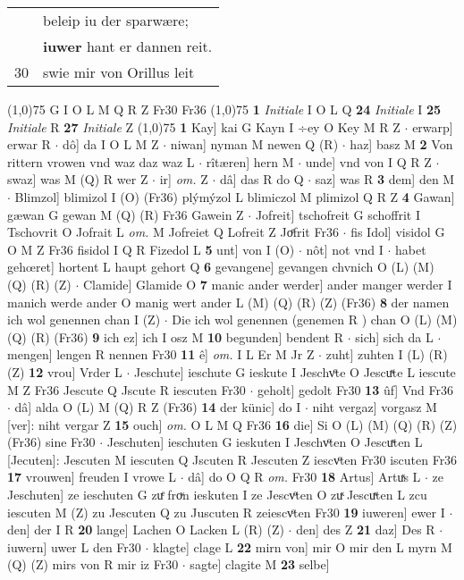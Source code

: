 \documentclass[8pt,a4paper,notitlepage]{article}
\begin{document}
\begin{table}[ht]
\begin{minipage}[t]{0.5\linewidth}
\begin{tabular}{rl}
 & beleip iu der sparwære;\\ 
 & \textbf{iuwer} hant er dannen reit.\\ 
30 & swie mir von Orillus leit\\ 
\end{tabular}
\scriptsize
\line(1,0){75} \newline
G I O L M Q R Z Fr30 Fr36 \newline
\line(1,0){75} \newline
\textbf{1} \textit{Initiale} I O L Q  \textbf{24} \textit{Initiale} I  \textbf{25} \textit{Initiale} R  \textbf{27} \textit{Initiale} Z  \newline
\line(1,0){75} \newline
\textbf{1} Kay] kai G Kayn I ÷ey O Key M R Z  $\cdot$ erwarp] erwar R  $\cdot$ dô] da I O L M Z  $\cdot$ niwan] nyman M newen Q (R)  $\cdot$ haz] basz M \textbf{2} Von rittern vrowen vnd waz daz waz L  $\cdot$ rîtæren] hern M  $\cdot$ unde] vnd von I Q R Z  $\cdot$ swaz] was M (Q) R wer Z  $\cdot$ ir] \textit{om.} Z  $\cdot$ dâ] das R do Q  $\cdot$ saz] was R \textbf{3} dem] den M  $\cdot$ Blimzol] blimizol I (O) (Fr36) plýmýzol L blimiczol M plimizol Q R Z \textbf{4} Gawan] gæwan G gewan M (Q) (R) Fr36 Gawein Z  $\cdot$ Jofreit] tschofreit G schoffrit I Tschovrit O Jofrait L \textit{om.} M Jofreiet Q Lofreit Z Joͤfrit Fr36  $\cdot$ fis Idol] visidol G O M Z Fr36 fisidol I Q R Fizedol L \textbf{5} unt] von I (O)  $\cdot$ nôt] not vnd I  $\cdot$ habet gehœret] hortent L haupt gehort Q \textbf{6} gevangene] gevangen chvnich O (L) (M) (Q) (R) (Z)  $\cdot$ Clamide] Glamide O \textbf{7} manic ander werder] ander manger werder I manich werde ander O manig wert ander L (M) (Q) (R) (Z) (Fr36) \textbf{8} der namen ich wol genennen chan I (Z)  $\cdot$ Die ich wol genennen (genemen R ) chan O (L) (M) (Q) (R) (Fr36) \textbf{9} ich ez] ich I osz M \textbf{10} begunden] bendent R  $\cdot$ sich] sich da L  $\cdot$ mengen] lengen R nennen Fr30 \textbf{11} ê] \textit{om.} I L Er M Jr Z  $\cdot$ zuht] zuhten I (L) (R) (Z) \textbf{12} vrou] Vrder L  $\cdot$ Jeschute] ieschute G ieskute I Jeschvͦte O Jescuͯte L iescute M Z Fr36 Jescute Q Jscute R iescuten Fr30  $\cdot$ geholt] gedolt Fr30 \textbf{13} ûf] Vnd Fr36  $\cdot$ dâ] alda O (L) M (Q) R Z (Fr36) \textbf{14} der künic] do I  $\cdot$ niht vergaz] vorgasz M [ver]: niht vergar Z \textbf{15} ouch] \textit{om.} O L M Q Fr36 \textbf{16} die] Si O (L) (M) (Q) (R) (Z) (Fr36) sine Fr30  $\cdot$ Jeschuten] ieschuten G ieskuten I Jeschvͦten O Jescuͯten L [Jecuten]: Jescuten M iescuten Q Jscuten R Jescuten Z iescvͦten Fr30 iscuten Fr36 \textbf{17} vrouwen] freuden I vrowe L  $\cdot$ dâ] do O Q R \textit{om.} Fr30 \textbf{18} Artus] Artuͯs L  $\cdot$ ze Jeschuten] ze ieschuten G zuͤ froͮn ieskuten I ze Jescvͦten O zuͯ Jescuͯten L zcu iescuten M (Z) zu Jescuten Q zu Juscuten R zeiescvͦten Fr30 \textbf{19} iuweren] ewer I  $\cdot$ den] der I R \textbf{20} lange] Lachen O Lacken L (R) (Z)  $\cdot$ den] des Z \textbf{21} daz] Des R  $\cdot$ iuwern] uwer L den Fr30  $\cdot$ klagte] clage L \textbf{22} mirn von] mir O mir den L myrn M (Q) (Z) mirs von R mir iz Fr30  $\cdot$ sagte] clagite M \textbf{23} selbe] 
\end{minipage}
\end{table}
\end{document}
